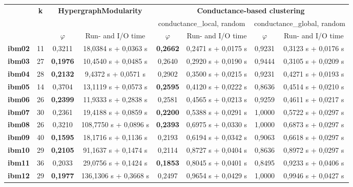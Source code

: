 \documentclass[acmsmall,nonacm,screen,review]{acmart}
\begin{document}
\begin{table}[!ht]
    \centering
    \small
    \begin{tabular}{|c|c|c|c|c|c|c|c|} \hline
               & \multirow{2}{*}{\textbf{k}}  & \multicolumn{2}{c}{\multirow{2}{*}{{\textbf{HypergraphModularity}}}} & \multicolumn{4}{|c|}{\textbf{Conductance-based clustering}} \\ \cline{5-8}
               &       & \multicolumn{2}{c}{} & \multicolumn{2}{|c|}{conductance\_local, random}    & \multicolumn{2}{c|}{conductance\_global, random} \\ \hline
               &       & $\varphi$ & Run- and I/O time & $\varphi$ & Run- and I/O time & $\varphi$ & Run- and I/O time \\ \hline 
\textbf{ibm02} & 11         & 0,3211 & 18,0384 s + 0,0363 s  & \textbf{0,2662} & 0,2471 s + 0,0175 s & 0,9231 & 0,3123 s + 0,0176 s  \\ 
\textbf{ibm03} & 27         & \textbf{0,1976} & 10,4540 s + 0,0485 s  & 0,2640 & 0,2920 s + 0,0190 s & 0,9444 & 0,3105 s + 0,0209 s  \\ 
\textbf{ibm04} & 28         & \textbf{0,2132} & 9,4372 s + 0,0571 s   & 0,2902 & 0,3500 s + 0,0215 s & 0,9231 & 0,4271 s + 0,0193 s  \\ 
\textbf{ibm05} & 14         & 0,3704 & 13,1119 s + 0,0573 s  & \textbf{0,2595} & 0,4120 s + 0,0222 s & 0,8636 & 0,4514 s + 0,0210 s  \\ 
\textbf{ibm06} & 26         & \textbf{0,2399} & 11,9333 s + 0,2838 s  & 0,2581 & 0,4565 s + 0,0213 s & 0,9259 & 0,4611 s + 0,0217 s  \\ 
\textbf{ibm07} & 30         & 0,2361 & 19,4188 s + 0,0859 s  & \textbf{0,2200} & 0,5388 s + 0,0291 s & 1,0000 & 0,5722 s + 0,0297 s  \\ 
\textbf{ibm08} & 26         & 0,3210 & 108,7750 s + 0,0896 s & \textbf{0,2393} & 0,6975 s + 0,0330 s & 1,0000 & 0,6873 s + 0,0297 s  \\ 
\textbf{ibm09} & 40         & \textbf{0,1595} & 18,1716 s + 0,1136 s  & 0,2193 & 0,6194 s + 0,0342 s & 0,9063 & 0,6618 s + 0,0297 s  \\ 
\textbf{ibm10} & 29         & \textbf{0,2105} & 91,1637 s + 0,1474 s  & 0,2114 & 0,8727 s + 0,0404 s & 0,8636 & 0,8972 s + 0,0297 s  \\ 
\textbf{ibm11} & 36         & 0,2033 & 29,0756 s + 0,1424 s  & \textbf{0,1853} & 0,8045 s + 0,0401 s & 0,8495 & 0,9233 s + 0,0406 s  \\ 
\textbf{ibm12} & 29         & \textbf{0,1977} & 136,1306 s + 0,3668 s & 0,2497 & 0,9654 s + 0,0429 s & 1,0000 & 0,9946 s + 0,0427 s  \\ 

\end{tabular}
\end{table}
\end{document}
